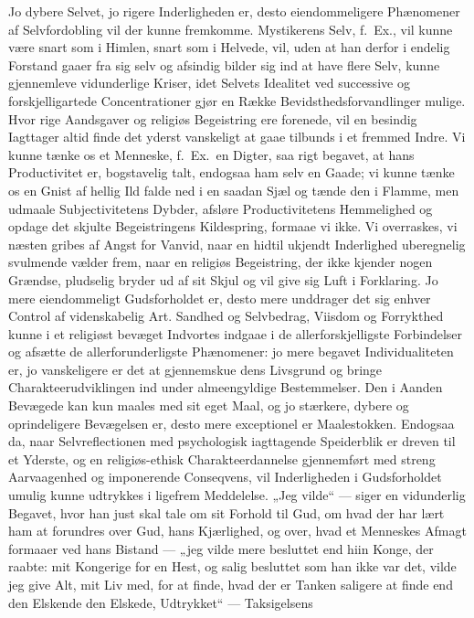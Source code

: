 \documentclass[12pt]{book}
\begin{document}
Jo dybere Selvet, jo rigere Inderligheden er, desto eiendommeligere
Phænomener af Selvfordobling vil der kunne fremkomme. Mystikerens
Selv, f.\ Ex., vil kunne være snart som i Himlen, snart som i
Helvede, vil, uden at han derfor i endelig Forstand gaaer fra sig
selv og afsindig bilder sig ind at have flere Selv, kunne
gjennemleve vidunderlige Kriser, idet Selvets Idealitet ved
successive og forskjelligartede Concentrationer gjør en Række
Bevidsthedsforvandlinger mulige. Hvor rige Aandsgaver og religiøs
Begeistring ere forenede, vil en besindig Iagttager altid finde det
yderst vanskeligt at gaae tilbunds i et fremmed Indre. Vi kunne tænke
os et Menneske, f.\ Ex.\ en Digter, saa rigt begavet, at hans
Productivitet er, bogstavelig talt, endogsaa ham selv en Gaade; vi
kunne tænke os en Gnist af hellig Ild falde ned i en saadan Sjæl og
tænde den i Flamme, men udmaale Subjectivitetens Dybder, afsløre
Productivitetens Hemmelighed og opdage det skjulte Begeistringens
Kildespring, formaae vi ikke. Vi overraskes, vi næsten gribes af
Angst for Vanvid, naar en hidtil ukjendt Inderlighed uberegnelig
svulmende vælder frem, naar en religiøs Begeistring, der ikke kjender
nogen Grændse, pludselig bryder ud af sit Skjul og vil give sig Luft
i Forklaring. Jo mere eiendommeligt Gudsforholdet er, desto mere
unddrager det sig enhver Control af videnskabelig Art. Sandhed og
Selvbedrag,
Viisdom og Forrykthed kunne i et religiøst bevæget Indvortes indgaae
i de allerforskjelligste Forbindelser og afsætte de
allerforunderligste Phænomener: jo mere begavet Individualiteten er,
jo vanskeligere er det at gjennemskue dens Livsgrund og bringe
Charakteerudviklingen ind under almeengyldige Bestemmelser. Den i
Aanden Bevægede kan kun maales med sit eget Maal, og jo stærkere,
dybere og oprindeligere Bevægelsen er, desto mere exceptionel er
Maalestokken. Endogsaa da, naar Selvreflectionen med psychologisk
iagttagende Speiderblik er dreven til et Yderste, og en
religiøs-ethisk Charakteerdannelse gjennemført med streng
Aarvaagenhed og imponerende Conseqvens, vil Inderligheden i
Gudsforholdet umulig kunne udtrykkes i ligefrem Meddelelse. „Jeg
vilde“ --- siger en vidunderlig Begavet, hvor han just skal tale om
sit Forhold til Gud, om hvad der har lært ham at forundres over Gud,
hans Kjærlighed, og over, hvad et Menneskes Afmagt formaaer ved hans
Bistand --- „jeg vilde mere besluttet end hiin Konge, der raabte: mit
Kongerige for en Hest, og salig besluttet som han ikke var det, vilde
jeg give Alt, mit Liv med, for at finde, hvad der er Tanken saligere
at finde end den Elskende den Elskede, Udtrykket“ --- Taksigelsens
\end{document}
